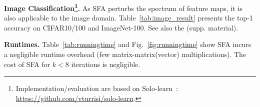 \vspace{0.1cm}
\noindent\textbf{Image Classification\footnote{Implementation/evaluation are based on Solo-learn~\cite{JMLR:v23:21-1155}: \url{https://github.com/vturrisi/solo-learn}.$\!\!\!\!$}.}
As SFA perturbs the spectrum of feature maps, it is also applicable to %
the image domain. Table~\ref{tab:image_result}  presents the top-1 accuracy on CIFAR10/100 and ImageNet-100. See also the  (supp. material). 


\vspace{0.1cm}
\noindent\textbf{Runtimes.}  
Table~\ref{tab:runningtime} and Fig.~\ref{fig:runningtime} show SFA incurs a negligible runtime overhead  (few matrix-matrix(vector) multiplications). %
The cost of SFA for $k\!<\!8$ iterations %
is negligible.





